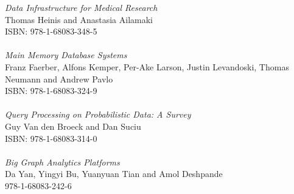 \vspace{12pt}
\noindent \textit{Data Infrastructure for Medical Research}\\
Thomas Heinis and Anastasia Ailamaki\\
ISBN: 978-1-68083-348-5\\
\\
\noindent \textit{Main Memory Database Systems}\\
Franz Faerber, Alfons Kemper, Per-Ake Larson, Justin Levandoski, Thomas Neumann and Andrew Pavlo\\
ISBN: 978-1-68083-324-9\\
\\
\noindent \textit{Query Processing on Probabilistic Data: A Survey}\\
Guy Van den Broeck and Dan Suciu\\
ISBN: 978-1-68083-314-0\\
\\
\noindent \textit{Big Graph Analytics Platforms}\\
Da Yan, Yingyi Bu, Yuanyuan Tian and Amol Deshpande\\
978-1-68083-242-6
